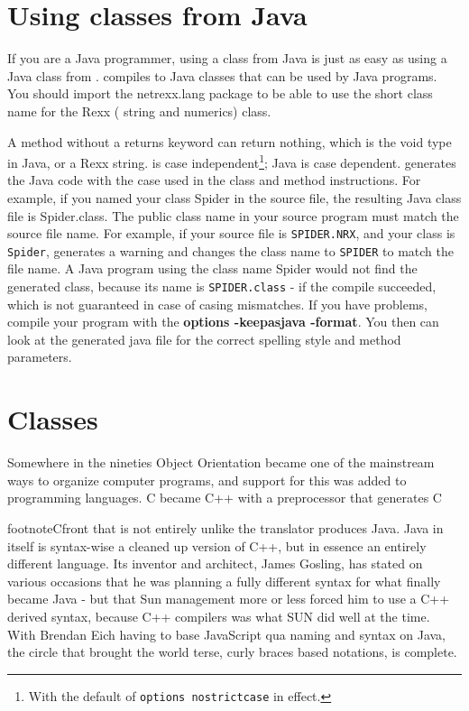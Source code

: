 {\chapter{Using \nr{} classes from Java}
If you are a Java programmer, using a \nr{} class from Java is just as
easy as using a Java class from \nr{}. \nr{} compiles to Java classes that can be used by Java programs.
You should import the netrexx.lang package to be able to use the short
class name for the Rexx (\nr{} string and numerics) class.

A \nr{} method without a returns keyword can return nothing, which is the void type in Java, or a Rexx string. 
\nr{}is case independent\footnote{With the default of \texttt{options
  nostrictcase} in effect.}; Java is case dependent. \nr{} generates
the Java code with the case used in the class and method
instructions. For example, if you named your class Spider in the \nr{}
source file, the resulting Java class file is Spider.class.
The public class name in your source program must match the \nr{}
source file name. For example, if your source file is \texttt{SPIDER.NRX}, and
your class is \texttt{Spider}, \nr{} generates a warning and changes the
class name to \texttt{SPIDER} to match the file name. A Java program using the
class name Spider would not find the generated class, because its name
is \texttt{SPIDER.class} - if the compile succeeded, which is not guaranteed in
case of casing mismatches.
If you have problems, compile your \nr{} program with the \textbf{options
-keepasjava -format}. You then can look at the generated java file for the correct spelling style and method parameters.

\chapter{Classes}\label{classes}
Somewhere in the nineties Object Orientation became one of the
mainstream ways to organize computer programs, and support for this
was added to programming languages. C became C++ with a preprocessor
that generates C{footnote{Cfront} that is not entirely unlike the
  \nr{} translator produces Java. Java in itself is syntax-wise a
  cleaned up version of C++, but in essence an entirely different
  language. Its inventor and architect, James Gosling, has stated on
  various occasions that he was planning a fully different syntax for
  what finally became Java - but that Sun management more or less
  forced him to use a C++ derived syntax, because C++ compilers was
  what SUN did well at the time. With Brendan Eich having to base
  JavaScript qua naming and syntax on Java, the circle that brought
  the world terse, curly braces based notations, is complete.

}}
